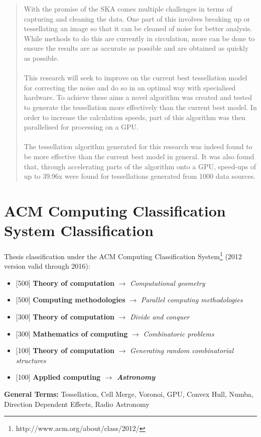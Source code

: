 \begin{abstract}
With the promise of the SKA comes multiple challenges in terms of capturing and cleaning the data. One part of this involves breaking up or tessellating an image so that it can be cleaned of noise for better analysis. While methods to do this are currently in circulation, more can be done to ensure the results are as accurate as possible and are obtained as quickly as possible.
\\
\\
This research will seek to improve on the current best tessellation model for correcting the noise and do so in an optimal way with specialised hardware. To achieve these aims a novel algorithm was created and tested to generate the tessellation more effectively than the current best model. In order to increase the calculation speeds, part of this algorithm was then parallelised for processing on a GPU.
\\
\\
The tessellation algorithm generated for this research was indeed found to be more effective than the current best model in general. It was also found that, through accelerating parts of the algorithm onto a GPU, speed-ups of up to 39.96x were found for tessellations generated from 1000 data sources.
\end{abstract}

\chapter*{ACM Computing Classification System Classification}
Thesis classification under the ACM Computing Classification System\footnote{http://www.acm.org/about/class/2012/} (2012 version valid through 2016):

\begin{itemize}
\item {[500] \textbf{Theory of computation} $\rightarrow$ \em {Computational geometry} }
\item {[500] \textbf{Computing methodologies} $\rightarrow$ \em {Parallel computing methodologies} }
\item {[300] \textbf{Theory of computation} $\rightarrow$ \em {Divide and conquer} }
\item {[300] \textbf{Mathematics of computing} $\rightarrow$ \em {Combinatoric problems} }
\item {[100] \textbf{Theory of computation} $\rightarrow$ \em {Generating random combinatorial structures} }
\item {[100] \bf{Applied computing} $\rightarrow$ \em {Astronomy} }
\end{itemize}
\textbf{General Terms:} Tessellation, Cell Merge, Voronoi, GPU, Convex Hull, Numba, Direction Dependent Effects, Radio Astronomy

